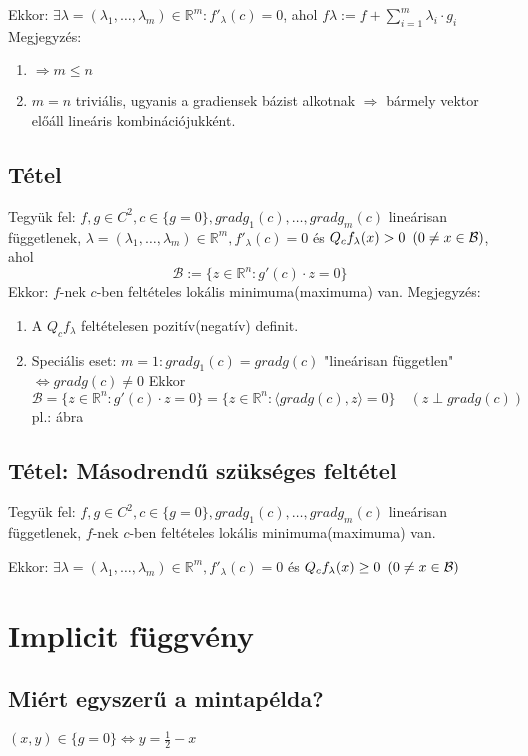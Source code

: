 \documentclass[a4paper,11.5pt]{article}
\begin{document}
Ekkor: $\exists\lambda =(\lambda_1 ,\ldots ,\lambda_m )\in\mathbb{R}^{m}:f'_{\lambda} (c)=0$, ahol $f\lambda :=f+\sum_{i=1}^{m}\lambda_i\cdot g_i$
Megjegyzés:
\begin{enumerate}
    \item $\Rightarrow m\leq n$
    \item $m=n$ triviális, ugyanis a gradiensek bázist alkotnak $\Rightarrow$ bármely vektor előáll lineáris kombinációjukként.
\end{enumerate}
\subsection{Tétel}
Tegyük fel: $f,g\in C^2 ,c\in\{g=0\}, grad g_1 (c),\ldots ,grad g_m (c)$ lineárisan függetlenek, $\lambda =(\lambda_{1} ,\ldots ,\lambda_{m} )\in\mathbb{R}^{m}, f'_{\lambda}(c)=0$ és $Q_c f_{\lambda}(x)>0\enskip (0\neq x\in\mathcal{B})$, ahol
    \begin{equation*}
        \mathcal{B}:=\{z\in\mathbb{R}^{n}:g'(c)\cdot z=0\}
    \end{equation*}
    Ekkor: $f$-nek $c$-ben feltételes lokális minimuma(maximuma) van.
    Megjegyzés:
    \begin{enumerate}
        \item A $Q_c f_{\lambda}$ feltételesen pozitív(negatív) definit.
        \item Speciális eset: $m=1: gradg_1 (c)=gradg(c)$ "lineárisan független" $\Leftrightarrow grad g(c)\neq 0$
        Ekkor $\mathcal{B}=\{z\in\mathbb{R}^{n}:g'(c)\cdot z=0\}=\{z\in\mathbb{R}^{n}:\langle gradg(c),z\rangle =0\}\quad (z\perp gradg(c))$
        pl.: ábra
    \end{enumerate}
    \subsection{Tétel: Másodrendű szükséges feltétel}
    Tegyük fel: $f,g\in C^2 ,c\in\{g=0\}, grad g_1 (c),\ldots ,grad g_m (c)$ lineárisan függetlenek, $f$-nek $c$-ben feltételes lokális minimuma(maximuma) van.

    Ekkor: $\exists\lambda =(\lambda_1 ,\ldots ,\lambda_m )\in\mathbb{R}^{m}, f'_{\lambda}(c)=0$ és $Q_c f_{\lambda}(x)\geq 0\enskip (0\neq x\in\mathcal{B})$

    \section{Implicit függvény}
    \subsection{Miért egyszerű a mintapélda?}
    $(x,y)\in\{g=0\}\Leftrightarrow y=\frac{1}{2}-x$
\end{document}
